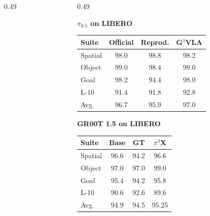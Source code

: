\documentclass[aspectratio=169,11pt]{beamer}
\begin{document}
\begin{frame}
\begin{columns}[T,onlytextwidth]
\begin{column}{0.49\textwidth}
    \end{column}

    \hfill

    \begin{column}{0.49\textwidth}

      \textbf{\small $\pi_{0.5}$ on LIBERO}

      \vspace{0.06cm}

      \begin{table}
      \centering
      \scriptsize
      \renewcommand{\arraystretch}{1.12}
      \begin{tabular}{lccc}
        \toprule
        \textbf{Suite} & \textbf{Official} & \textbf{Reprod.} & \textbf{G$^3$VLA} \\
        \midrule
        Spatial & 98.0 & 98.8 & 98.2 \\
        Object  & 99.0 & 98.4 & 99.0 \\
        Goal    & 98.2 & 94.4 & 98.0 \\
        L-10    & 91.4 & 91.8 & 92.8 \\
        Avg.    & 96.7 & 95.9 & 97.0 \\
        \bottomrule
      \end{tabular}
      \end{table}

      \vspace{0.18cm}

      \textbf{\small GR00T 1.5 on LIBERO}

      \vspace{0.06cm}

      \begin{table}
      \centering
      \scriptsize
      \renewcommand{\arraystretch}{1.12}
      \begin{tabular}{lccc}
        \toprule
        \textbf{Suite} & \textbf{Base} & \textbf{GT} & \textbf{$\pi^3$X} \\
        \midrule
        Spatial & 96.6 & 94.2 & 96.6 \\
        Object  & 97.0 & 97.0 & 99.0 \\
        Goal    & 95.4 & 94.2 & 95.8 \\
        L-10    & 90.6 & 92.6 & 89.6 \\
        Avg.    & 94.9 & 94.5 & 95.25 \\
        \bottomrule
      \end{tabular}
      \end{table}


\end{column}
\end{columns}
\end{frame}
\end{document}
